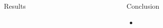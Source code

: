 \documentclass[final,t]{beamer}
\begin{document}
\begin{frame}{}
\begin{columns}
\begin{column}{.64\linewidth}
\begin{block}{Results}
\end{block}

  \end{column}

  \begin{column}{.31\linewidth}

\begin{block}{Conclusion}

\begin{itemize}
\item 
\end{itemize}

\end{block}

  \end{column}
\end{columns}

\end{frame}
\end{document}
